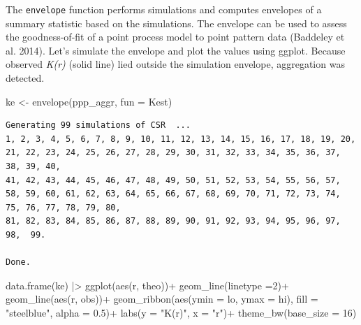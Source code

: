 \documentclass[
  letterpaper,
  DIV=11,
  numbers=noendperiod]{scrreprt}
\newenvironment{Shaded}{\begin{snugshade}}{\end{snugshade}}
\newcommand{\AttributeTok}[1]{\textcolor[rgb]{0.40,0.45,0.13}{#1}}
\newcommand{\DecValTok}[1]{\textcolor[rgb]{0.68,0.00,0.00}{#1}}
\newcommand{\FloatTok}[1]{\textcolor[rgb]{0.68,0.00,0.00}{#1}}
\newcommand{\FunctionTok}[1]{\textcolor[rgb]{0.28,0.35,0.67}{#1}}
\newcommand{\NormalTok}[1]{\textcolor[rgb]{0.00,0.23,0.31}{#1}}
\newcommand{\OtherTok}[1]{\textcolor[rgb]{0.00,0.23,0.31}{#1}}
\newcommand{\SpecialCharTok}[1]{\textcolor[rgb]{0.37,0.37,0.37}{#1}}
\newcommand{\StringTok}[1]{\textcolor[rgb]{0.13,0.47,0.30}{#1}}
\begin{document}
The \texttt{envelope} function performs simulations and computes
envelopes of a summary statistic based on the simulations. The envelope
can be used to assess the goodness-of-fit of a point process model to
point pattern data (Baddeley et al. 2014). Let's simulate the envelope
and plot the values using ggplot. Because observed \emph{K(r)} (solid
line) lied outside the simulation envelope, aggregation was detected.

\begin{Shaded}
\begin{Highlighting}[]
\NormalTok{ke }\OtherTok{\textless{}{-}} \FunctionTok{envelope}\NormalTok{(ppp\_aggr, }\AttributeTok{fun =}\NormalTok{ Kest)}
\end{Highlighting}
\end{Shaded}

\begin{verbatim}
Generating 99 simulations of CSR  ...
1, 2, 3, 4, 5, 6, 7, 8, 9, 10, 11, 12, 13, 14, 15, 16, 17, 18, 19, 20, 21, 22, 23, 24, 25, 26, 27, 28, 29, 30, 31, 32, 33, 34, 35, 36, 37, 38, 39, 40,
41, 42, 43, 44, 45, 46, 47, 48, 49, 50, 51, 52, 53, 54, 55, 56, 57, 58, 59, 60, 61, 62, 63, 64, 65, 66, 67, 68, 69, 70, 71, 72, 73, 74, 75, 76, 77, 78, 79, 80,
81, 82, 83, 84, 85, 86, 87, 88, 89, 90, 91, 92, 93, 94, 95, 96, 97, 98,  99.

Done.
\end{verbatim}

\begin{Shaded}
\begin{Highlighting}[]
\FunctionTok{data.frame}\NormalTok{(ke) }\SpecialCharTok{|\textgreater{}} 
  \FunctionTok{ggplot}\NormalTok{(}\FunctionTok{aes}\NormalTok{(r, theo))}\SpecialCharTok{+}
  \FunctionTok{geom\_line}\NormalTok{(}\AttributeTok{linetype =}\DecValTok{2}\NormalTok{)}\SpecialCharTok{+}
  \FunctionTok{geom\_line}\NormalTok{(}\FunctionTok{aes}\NormalTok{(r, obs))}\SpecialCharTok{+}
  \FunctionTok{geom\_ribbon}\NormalTok{(}\FunctionTok{aes}\NormalTok{(}\AttributeTok{ymin =}\NormalTok{ lo, }\AttributeTok{ymax =}\NormalTok{ hi),}
              \AttributeTok{fill =} \StringTok{"steelblue"}\NormalTok{, }\AttributeTok{alpha =} \FloatTok{0.5}\NormalTok{)}\SpecialCharTok{+}
  \FunctionTok{labs}\NormalTok{(}\AttributeTok{y =} \StringTok{"K(r)"}\NormalTok{, }\AttributeTok{x =} \StringTok{"r"}\NormalTok{)}\SpecialCharTok{+}
  \FunctionTok{theme\_bw}\NormalTok{(}\AttributeTok{base\_size =} \DecValTok{16}\NormalTok{)}
\end{Highlighting}
\end{Shaded}
\end{document}
